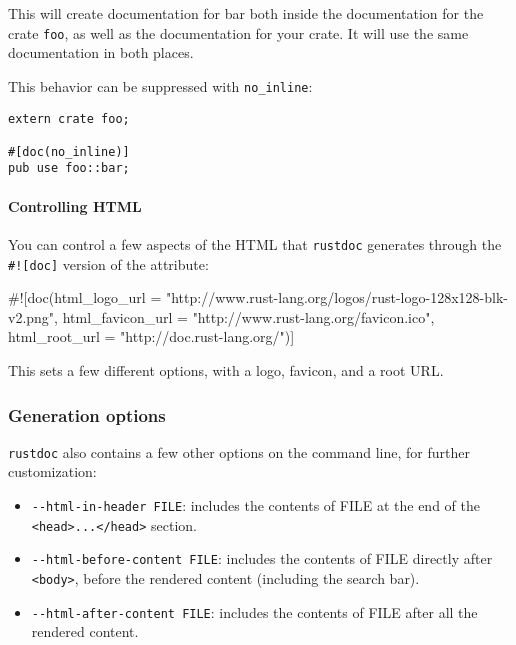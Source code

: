 \documentclass[a4paper,]{book}
\newenvironment{Shaded}{\begin{snugshade}}{\end{snugshade}}
\newcommand{\StringTok}[1]{\textcolor[rgb]{0.31,0.60,0.02}{{#1}}}
\newcommand{\NormalTok}[1]{{#1}}
\begin{document}
This will create documentation for bar both inside the documentation for
the crate \texttt{foo}, as well as the documentation for your crate. It
will use the same documentation in both places.

This behavior can be suppressed with \texttt{no\_inline}:

\begin{verbatim}
extern crate foo;

#[doc(no_inline)]
pub use foo::bar;
\end{verbatim}

\paragraph{Controlling HTML}\label{controlling-html}

You can control a few aspects of the HTML that \texttt{rustdoc}
generates through the \texttt{\#!{[}doc{]}} version of the attribute:

\begin{Shaded}
\begin{Highlighting}[]
\NormalTok{#![doc(html_logo_url = }\StringTok{"http://www.rust-lang.org/logos/rust-logo-128x128-blk-v2.png"}\NormalTok{,}
       \NormalTok{html_favicon_url = }\StringTok{"http://www.rust-lang.org/favicon.ico"}\NormalTok{,}
       \NormalTok{html_root_url = }\StringTok{"http://doc.rust-lang.org/"}\NormalTok{)]}
\end{Highlighting}
\end{Shaded}

This sets a few different options, with a logo, favicon, and a root URL.

\subsubsection{Generation options}\label{generation-options}

\texttt{rustdoc} also contains a few other options on the command line,
for further customization:

\begin{itemize}
\itemsep1pt\parskip0pt
\item
  \texttt{-\/-html-in-header\ FILE}: includes the contents of FILE at
  the end of the
  \texttt{\textless{}head\textgreater{}...\textless{}/head\textgreater{}}
  section.
\item
  \texttt{-\/-html-before-content\ FILE}: includes the contents of FILE
  directly after \texttt{\textless{}body\textgreater{}}, before the
  rendered content (including the search bar).
\item
  \texttt{-\/-html-after-content\ FILE}: includes the contents of FILE
  after all the rendered content.
\end{itemize}
\end{document}
